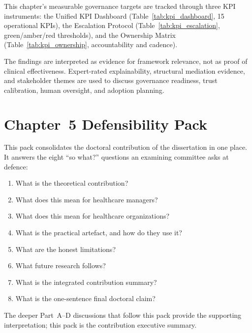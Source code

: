 \noindent This chapter's measurable governance targets are tracked through three KPI instruments: the Unified KPI Dashboard (Table~\ref{tab:kpi_dashboard}, 15 operational KPIs), the Escalation Protocol (Table~\ref{tab:kpi_escalation}, green/amber/red thresholds), and the Ownership Matrix (Table~\ref{tab:kpi_ownership}, accountability and cadence).
\vspace{0.5em}

The findings are interpreted as evidence for framework relevance, not as proof of clinical effectiveness. Expert-rated explainability, structural mediation evidence, and stakeholder themes are used to discuss governance readiness, trust calibration, human oversight, and adoption planning.


\section*{Chapter~5 Defensibility Pack}
\label{sec:ch5_defensibility_pack}

\noindent This pack consolidates the doctoral contribution of the dissertation in one place. It answers the eight ``so what?'' questions an examining committee asks at defence:
\begin{enumerate}[leftmargin=*, itemsep=1pt, label=(\arabic*)]
    \item What is the theoretical contribution?
    \item What does this mean for healthcare managers?
    \item What does this mean for healthcare organizations?
    \item What is the practical artefact, and how do they use it?
    \item What are the honest limitations?
    \item What future research follows?
    \item What is the integrated contribution summary?
    \item What is the one-sentence final doctoral claim?
\end{enumerate}
\noindent The deeper Part~A--D discussions that follow this pack provide the supporting interpretation; this pack is the contribution executive summary.

